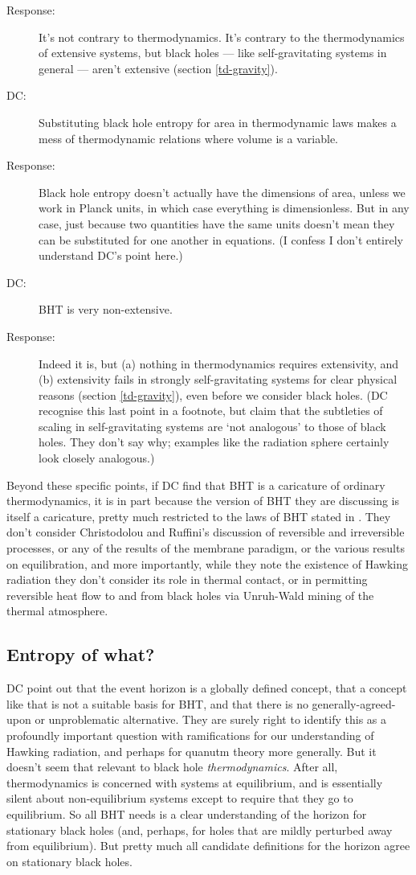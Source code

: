 \documentclass[12pt]{article}
\begin{document}
\begin{description}
\item[Response:] It's not contrary to thermodynamics. It's contrary to the thermodynamics of extensive systems, but black holes --- like self-gravitating systems in general --- aren't extensive (section \ref{td-gravity}).
\item[DC:] Substituting black hole entropy for area in thermodynamic laws makes a mess of thermodynamic relations where volume is a variable.
\item[Response:] Black hole entropy doesn't actually have the dimensions of area, unless we work in Planck units, in which case everything is dimensionless. But in any case, just because two quantities have the same units doesn't mean they can be substituted for one another in equations. (I confess I don't entirely understand DC's point here.)
\item[DC:] BHT is very non-extensive.
\item[Response:] Indeed it is, but (a) nothing in thermodynamics requires extensivity, and (b) extensivity fails in strongly self-gravitating systems for clear physical reasons (section \ref{td-gravity}), even before we consider black holes. (DC recognise this last point in a footnote, but claim that the subtleties of scaling in self-gravitating systems are `not analogous' to those of black holes. They don't say why; examples like the radiation sphere certainly look closely analogous.)
\end{description}
Beyond these specific points, if DC find that BHT is a caricature of ordinary thermodynamics, it is in part because the version of BHT they are discussing is itself a caricature, pretty much restricted to the laws of BHT stated in . They don't consider Christodolou and Ruffini's discussion of reversible and irreversible processes, or any of the results of the membrane paradigm, or the various results on equilibration, and more importantly, while they note the existence of Hawking radiation they don't consider its role in thermal contact, or in permitting reversible heat flow to and from black holes via Unruh-Wald mining of the thermal atmosphere.

\subsection{Entropy of what?}

DC point out that the event horizon is a globally defined concept, that a concept like that is not a suitable basis for BHT, and that there is no generally-agreed-upon or unproblematic alternative. They are surely right to identify this as a profoundly important question with ramifications for our understanding of Hawking radiation, and perhaps for quanutm theory more generally. But it doesn't seem that relevant to black hole \emph{thermodynamics}. After all, thermodynamics is concerned with systems at equilibrium, and is essentially silent about non-equilibrium systems except to require that they go to equilibrium. So all BHT needs is a clear understanding of the horizon for stationary black holes (and, perhaps, for holes that are mildly perturbed away from equilibrium). But pretty much all candidate definitions for the horizon agree on stationary black holes. 
\end{document}
